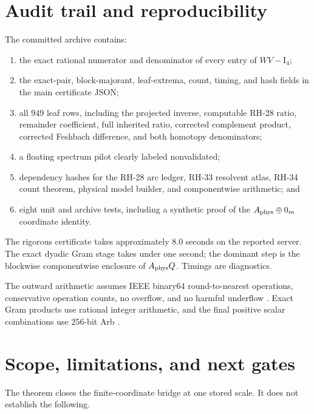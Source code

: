 \documentclass[11pt]{article}
\theoremstyle{definition}
\theoremstyle{remark}
\newcommand{\Id}{\mathrm I}
\newcommand{\Aphys}{A_{\rm phys}}
\begin{document}
\section{Audit trail and reproducibility}
\label{sec:audit}

The committed archive contains:

\begin{enumerate}
 \item the exact rational numerator and denominator of every entry of
       \(WV-\Id_4\);
 \item the exact-pair, block-majorant, leaf-extrema, count, timing, and hash
       fields in the main certificate JSON;
 \item all \(949\) leaf rows, including the projected inverse,
       computable RH-28 ratio, remainder coefficient, full inherited ratio,
       corrected complement product, corrected Feshbach difference, and
       both homotopy denominators;
 \item a floating spectrum pilot clearly labeled nonvalidated;
 \item dependency hashes for the RH-28 arc ledger, RH-33 resolvent atlas,
       RH-34 count theorem, physical model builder, and componentwise
       arithmetic; and
 \item eight unit and archive tests, including a synthetic proof of the
       \(\Aphys\oplus0_m\) coordinate identity.
\end{enumerate}

The rigorous certificate takes approximately \(8.0\) seconds on the
reported server.  The exact dyadic Gram stage takes under one second; the
dominant step is the blockwise componentwise enclosure of \(\Aphys Q\).
Timings are diagnostics.

The outward arithmetic assumes IEEE binary64 round-to-nearest operations,
conservative operation counts, no overflow, and no harmful underflow
\citep{Higham2002,Rump2010}.  Exact Gram products use rational integer
arithmetic, and the final positive scalar combinations use \(256\)-bit Arb
\citep{Johansson2017}.

\section{Scope, limitations, and next gates}
\label{sec:limitations}

The theorem closes the finite-coordinate bridge at one stored scale.  It
does not establish the following.
\end{document}
